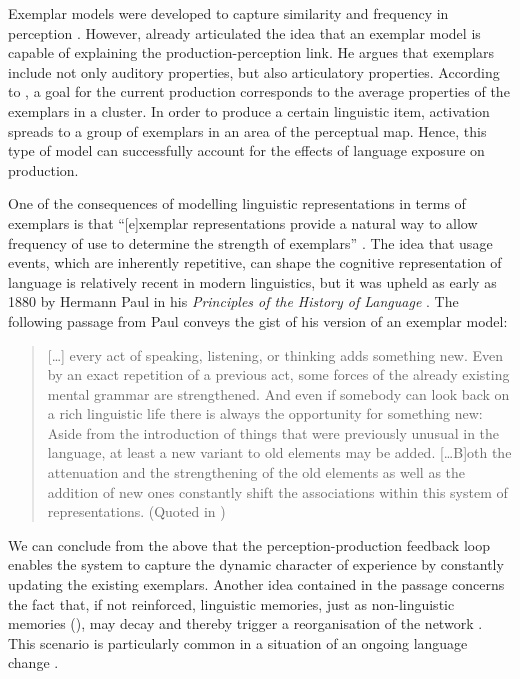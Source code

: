 Exemplar models were developed to capture similarity and frequency in perception \citep[cf.][]{pierrehumbert-2002}. However, already \citet{johnson97} articulated the idea that an exemplar model is capable of explaining the production-per\-cep\-tion link. He argues that exemplars include not only auditory properties, but also articulatory properties. According to \citet{pierrehumbert-2002}, a goal for the current production corresponds to the average properties of the exemplars in a cluster. In order to produce a certain linguistic item, activation spreads to a group of exemplars in an area of the perceptual map. Hence, this type of model can successfully account for the effects of language exposure on production.

One of the consequences of modelling linguistic representations in terms of exemplars is that ``[e]xemplar representations provide a natural way to allow frequency of use to determine the strength of exemplars'' \citep[717]{bybee-repetition-2006}. The idea that usage events, which are inherently repetitive, can shape the cognitive representation of language is relatively recent in modern linguistics, but it was upheld as early as 1880 by Hermann Paul in his \textit{Principles of the History of Language} \citep[cf.][]{auer-paul}. The following passage from Paul conveys the gist of his version of an exemplar model:

\begin{quote}
[\dots] every act of speaking, listening, or thinking adds something new. Even by an exact repetition of a previous act, some forces of the already existing mental grammar are strengthened. And even if somebody can look back on a rich linguistic life there is always the opportunity for something new: Aside from the introduction of things that were previously unusual in the language, at least a new variant to old elements may be added. [\dots B]oth the attenuation and the strengthening of the old elements as well as the addition of new ones constantly shift the associations within this system of representations. (Quoted in \citealt[31]{auer-etal-paul})
\end{quote}

\noindent We can conclude from the above that the perception-production feedback loop enables the system to capture the dynamic character of experience by constantly updating the existing exemplars. Another idea contained in the passage concerns the fact that, if not reinforced, linguistic memories, just as non-linguistic memories (\citealt[127]{sherwood-fundamentals-2012}), may decay  \citep{pierrehumbert-2001} and thereby trigger a reorganisation of the network \citep[cf.][]{bybee-beckner-2009}. This scenario is particularly common in a situation of an ongoing language change \citep[718]{bybee-repetition-2006}.

